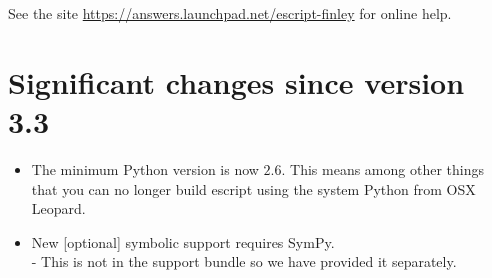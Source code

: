See the site \url{https://answers.launchpad.net/escript-finley} for online help.

\section{Significant changes since version 3.3}
\begin{itemize}
 \item The minimum Python version is now $2.6$.   
This means among other things that you can no longer build escript using the system Python from OSX Leopard.
 \item New [optional] symbolic support requires SymPy.   \\- This is not in the support bundle so we have provided it
    separately.
\end{itemize}

% 





